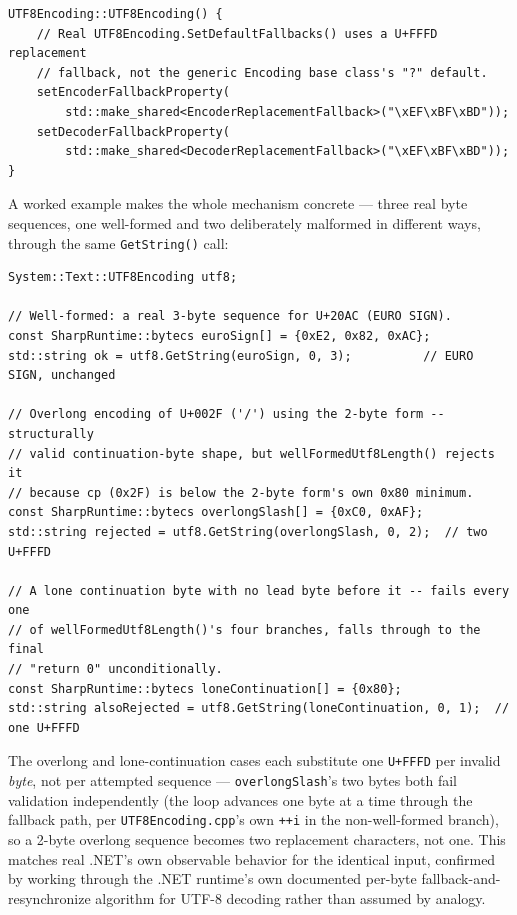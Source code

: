 \begin{lstlisting}
UTF8Encoding::UTF8Encoding() {
    // Real UTF8Encoding.SetDefaultFallbacks() uses a U+FFFD replacement
    // fallback, not the generic Encoding base class's "?" default.
    setEncoderFallbackProperty(
        std::make_shared<EncoderReplacementFallback>("\xEF\xBF\xBD"));
    setDecoderFallbackProperty(
        std::make_shared<DecoderReplacementFallback>("\xEF\xBF\xBD"));
}
\end{lstlisting}

A worked example makes the whole mechanism concrete --- three real byte sequences, one
well-formed and two deliberately malformed in different ways, through the same
\texttt{GetString()} call:

\begin{lstlisting}
System::Text::UTF8Encoding utf8;

// Well-formed: a real 3-byte sequence for U+20AC (EURO SIGN).
const SharpRuntime::bytecs euroSign[] = {0xE2, 0x82, 0xAC};
std::string ok = utf8.GetString(euroSign, 0, 3);          // EURO SIGN, unchanged

// Overlong encoding of U+002F ('/') using the 2-byte form -- structurally
// valid continuation-byte shape, but wellFormedUtf8Length() rejects it
// because cp (0x2F) is below the 2-byte form's own 0x80 minimum.
const SharpRuntime::bytecs overlongSlash[] = {0xC0, 0xAF};
std::string rejected = utf8.GetString(overlongSlash, 0, 2);  // two U+FFFD

// A lone continuation byte with no lead byte before it -- fails every one
// of wellFormedUtf8Length()'s four branches, falls through to the final
// "return 0" unconditionally.
const SharpRuntime::bytecs loneContinuation[] = {0x80};
std::string alsoRejected = utf8.GetString(loneContinuation, 0, 1);  // one U+FFFD
\end{lstlisting}

The overlong and lone-continuation cases each substitute one \texttt{U+FFFD} per invalid
\emph{byte}, not per attempted sequence --- \texttt{overlongSlash}'s two bytes both fail
validation independently (the loop advances one byte at a time through the fallback path, per
\texttt{UTF8Encoding.cpp}'s own \texttt{++i} in the non-well-formed branch), so a 2-byte
overlong sequence becomes two replacement characters, not one. This matches real .NET's own
observable behavior for the identical input, confirmed by working through the .NET runtime's
own documented per-byte fallback-and-resynchronize algorithm for UTF-8 decoding rather than
assumed by analogy.

